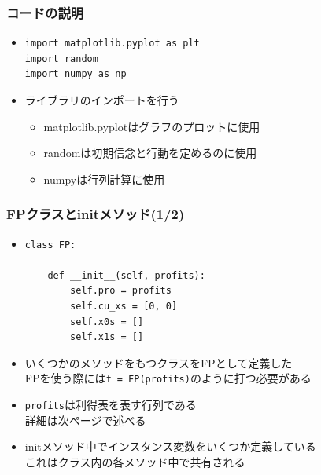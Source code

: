 \documentclass[dvipdfmx,fleqn]{beamer}
\begin{document}
\begin{frame}[fragile]   %
\frametitle{コードの説明}
\begin{itemize}\setlength{\parskip}{0.5em}

\item
\footnotesize
\begin{verbatim}
import matplotlib.pyplot as plt
import random
import numpy as np
\end{verbatim}
\pause
\normalsize
\item
ライブラリのインポートを行う\pause
\begin{itemize}\setlength{\parskip}{0.5em}
\item
matplotlib.pyplotはグラフのプロットに使用　\pause

\item
randomは初期信念と行動を定めるのに使用　\pause

\item
numpyは行列計算に使用
\end{itemize}

\end{itemize}
\end{frame}

\begin{frame}[fragile]%
\frametitle{FPクラスとinitメソッド(1/2)}
\begin{itemize}\setlength{\parskip}{0.5em}
\item

\footnotesize
\begin{verbatim}
class FP:

    def __init__(self, profits):
        self.pro = profits
        self.cu_xs = [0, 0]
        self.x0s = []
        self.x1s = []
 \end{verbatim}\pause
\normalsize

\item
いくつかのメソッドをもつクラスをFPとして定義した\pause\\
FPを使う際には\verb|f = FP(profits)|のように打つ必要がある\pause
\item
\verb|profits|は利得表を表す行列である\\
詳細は次ページで述べる\pause
\item
initメソッド中でインスタンス変数をいくつか定義している\pause\\
これはクラス内の各メソッド中で共有される



\end{itemize}
\end{frame}
\end{document}
